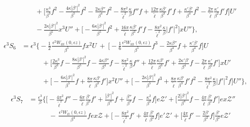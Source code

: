 \documentclass[10pt, reqno]{amsart}
\numberwithin{equation}{section}
\theoremstyle{definition}
\begin{document}
{{\begin{align}
\nonumber\\[2mm]
 & \qquad\quad+ \Big[
 \frac{\kappa^3}{\beta^3}f^2
 -\frac{4\kappa|\beta'|^2}{\beta^5} f^2
 - \frac{2\kappa\beta''}{\beta^4}f^2
 -\frac{8\pi^2}{{\tilde\ell}^2}\frac{\kappa}{\beta} f''f
 +\frac{12\pi }{ {\tilde\ell}}\frac{\kappa\beta'}{\beta^3} f' f
 + \frac{\kappa'\beta'} {\beta^4}f^2
 - \frac{2\pi}{{\tilde\ell}} \frac{\kappa'}{\beta^2} f'f\Big]U'
\nonumber\\[2mm]
 & \qquad\quad-\frac{2\kappa|\beta'|^2}{\beta^5} x^3 U''
 + \Big[ -\frac{6\kappa|\beta'|^2}{\beta^5}f^2
 + \frac{16\pi}{ {\tilde\ell}} \frac{\kappa\beta'}{\beta^3} f' f
-\frac{8\pi^2} {{\tilde\ell}^2}\frac{\kappa}{\beta} |f'|^2\Big]x U''
\Bigg\} ,
\end{align}
\begin{align}\label{S6}
 \epsilon^3 S_6& = \epsilon^3\Bigg\{
 - \frac{1}{2} \frac{\,\epsilon^2 W_{ttt}(0, \epsilon z)}{\beta^5}f x^2 U
\ +\
\Big[- \frac{1}{6} \frac{\epsilon^2W_{ttt}(0, \epsilon z)}{\beta^5}f^3
 -\frac{2\kappa\beta''}{\beta^4} f +\frac{\kappa'\beta'} {\beta^4} f\Big] U
\nonumber\\[2mm]
 & \qquad\quad + \Big[
 \frac{2\kappa^3}{\beta^3}f
 -\frac{8\kappa|\beta'|^2}{\beta^5} f
 -\frac{4\kappa\beta''}{\beta^4}f
 -\frac{8\pi^2}{{\tilde\ell}^2}\frac{\kappa}{\beta} f''
+\frac{12\pi }{ {\tilde\ell}}\frac{\kappa\beta'}{\beta^3} f'
+\frac{2\kappa'\beta'}{\beta^4}f
- \frac{2\pi}{{\tilde\ell}} \frac{\kappa'}{\beta^2} f'\Big]xU'
\nonumber\\[2mm]
 & \qquad\quad+ \Big[ -\frac{6\kappa|\beta'|^2}{\beta^5}f
 +\frac{8\pi}{ {\tilde\ell}}\frac{\kappa\beta'}{\beta^3} f'\Big] x^2 U''
 + \Big[ -\frac{2\kappa|\beta'|^2}{\beta^5}f^3
 +\frac{8\pi}{ {\tilde\ell}} \frac{\kappa\beta'}{\beta^3} f' f^2
 -\frac{8\pi^2} {{\tilde\ell}^2}\frac{\kappa}{\beta} |f'|^2 f \Big]U''
 \Bigg\},
\end{align}
\begin{align}\label{S7}
\epsilon^3S_7
& = \frac{\epsilon^3}\beta\Bigg\{ \Big[
-\frac{4\pi^2}{{\tilde\ell}^2}f''
-\frac{6\pi}{\tilde\ell} \frac{\beta'}{\beta^2} f'
+\frac{|\beta'|^2}{\beta^4}f
+\frac{\beta''} {\beta^3}f
\,-\,\frac{\kappa^2}{\beta^2}f
\Big]e {\mathcal Z}'
+\Big[\frac{2|\beta'|^2}{\beta^4} f
-\frac{4\pi}{{\tilde\ell}}\frac{\beta'}{\beta^2}f'
\Big]e x {\mathcal Z}''
\nonumber\\[2mm]
&\qquad\quad -\,\frac{\epsilon^2W_{tt}(0, \epsilon z)}{\beta^4}f e x{\mathcal Z}
+
\Big[ -\frac{8\pi^2}{{\tilde\ell}^2}f' +\frac{4\pi}{{\tilde\ell}}\frac{\beta'}{\beta^2}f\Big]e' {\mathcal Z}'
+
\Big[ \frac{4\pi}{{\tilde\ell}}f' -\frac{2\beta'}{\beta^2}f\Big] \frac{\beta'}{\beta^2}e {\mathcal Z}'

\end{align}}}
\end{document}
